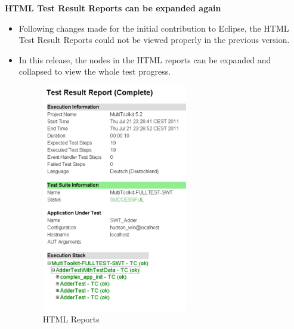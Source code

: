 \textbf{HTML Test Result Reports can be expanded again}
\begin{itemize}
\item Following changes made for the initial contribution to Eclipse, the HTML Test Result Reports could not be viewed properly in the previous version. 
\item In this release, the nodes in the HTML reports can be expanded and collapsed to view the whole test progress. 

\begin{figure}[h]
\begin{center}
\includegraphics[width=0.60\textwidth]{52/ps/HTMLReport}
\caption{HTML Reports}
\label{RNHTMLReport}
\end{center}
\end{figure}
		
\end{itemize}

